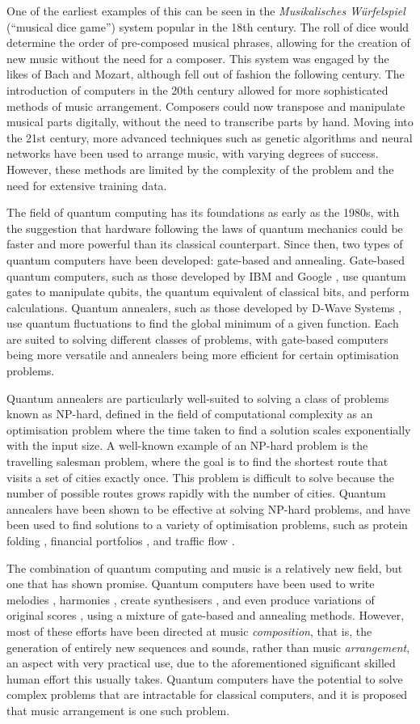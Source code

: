 \documentclass[12pt]{article}
\theoremstyle{definition}
\begin{document}
One of the earliest examples of this can be seen in the \textit{Musikalisches Würfelspiel} (``musical dice game'') system popular in the 18th century. The roll of dice would determine the order of pre-composed musical phrases, allowing for the creation of new music without the need for a composer. This system was engaged by the likes of Bach and Mozart, although fell out of fashion the following century.
The introduction of computers in the 20th century allowed for more sophisticated methods of music arrangement. Composers could now transpose and manipulate musical parts digitally, without the need to transcribe parts by hand. Moving into the 21st century, more advanced techniques such as genetic algorithms and neural networks have been used to arrange music, with varying degrees of success. However, these methods are limited by the complexity of the problem and the need for extensive training data.

The field of quantum computing has its foundations as early as the 1980s, with the suggestion that hardware following the laws of quantum mechanics could be faster and more powerful than its classical counterpart. Since then, two types of quantum computers have been developed: gate-based and annealing. Gate-based quantum computers, such as those developed by IBM  and Google , use quantum gates to manipulate qubits, the quantum equivalent of classical bits, and perform calculations. Quantum annealers, such as those developed by D-Wave Systems , use quantum fluctuations to find the global minimum of a given function. Each are suited to solving different classes of problems, with gate-based computers being more versatile and annealers being more efficient for certain optimisation problems. 

Quantum annealers are particularly well-suited to solving a class of problems known as NP-hard, defined in the field of computational complexity as an optimisation problem where the time taken to find a solution scales exponentially with the input size. A well-known example of an NP-hard problem is the travelling salesman problem, where the goal is to find the shortest route that visits a set of cities exactly once. This problem is difficult to solve because the number of possible routes grows rapidly with the number of cities. Quantum annealers have been shown to be effective at solving NP-hard problems, and have been used to find solutions to a variety of optimisation problems, such as protein folding , financial portfolios , and traffic flow .

The combination of quantum computing and music is a relatively new field, but one that has shown promise. Quantum computers have been used to write melodies , harmonies , create synthesisers , and even produce variations of original scores , using a mixture of gate-based and annealing methods. However, most of these efforts have been directed at music \textit{composition}, that is, the generation of entirely new sequences and sounds, rather than music \textit{arrangement}, an aspect with very practical use, due to the aforementioned significant skilled human effort this usually takes. Quantum computers have the potential to solve complex problems that are intractable for classical computers, and it is proposed that music arrangement is one such problem.
\end{document}
